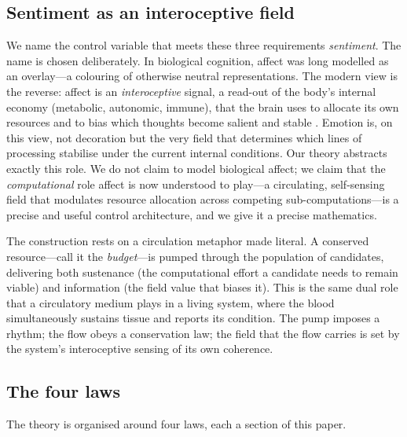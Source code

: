 \documentclass[11pt,a4paper]{article}
\theoremstyle{plain}
\theoremstyle{definition}
\theoremstyle{remark}
\begin{document}
\subsection{Sentiment as an interoceptive field}

We name the control variable that meets these three requirements
\emph{sentiment}. The name is chosen deliberately. In biological cognition,
affect was long modelled as an overlay---a colouring of otherwise neutral
representations. The modern view is the reverse: affect is an
\emph{interoceptive} signal, a read-out of the body's internal economy
(metabolic, autonomic, immune), that the brain uses to allocate its own
resources and to bias which thoughts become salient and stable
\citep{craig2002,damasio1994,barrett2017}. Emotion is, on this view, not
decoration but the very field that determines which lines of processing
stabilise under the current internal conditions. Our theory abstracts exactly
this role. We do not claim to model biological affect; we claim that the
\emph{computational} role affect is now understood to play---a circulating,
self-sensing field that modulates resource allocation across competing
sub-computations---is a precise and useful control architecture, and we give it
a precise mathematics.

The construction rests on a circulation metaphor made literal. A conserved
resource---call it the \emph{budget}---is pumped through the population of
candidates, delivering both sustenance (the computational effort a candidate
needs to remain viable) and information (the field value that biases it). This
is the same dual role that a circulatory medium plays in a living system, where
the blood simultaneously sustains tissue and reports its condition. The pump
imposes a rhythm; the flow obeys a conservation law; the field that the flow
carries is set by the system's interoceptive sensing of its own coherence.

\subsection{The four laws}

The theory is organised around four laws, each a section of this paper.
\end{document}
